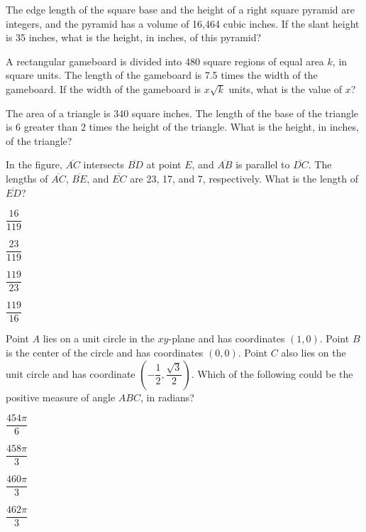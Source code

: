 \vfill
\noindent\begin{minipage}{\linewidth}
\par\smallskip
The edge length of the square base and the height of a right square pyramid are integers, and the pyramid has a volume of 16,464 cubic inches. If the slant height is 35 inches, what is the height, in inches, of this pyramid?
\end{minipage}
\vfill
\noindent\begin{minipage}{\linewidth}
\par\smallskip
A rectangular gameboard is divided into 480 square regions of equal area $k$, in square units. The length of the gameboard is 7.5 times the width of the gameboard. If the width of the gameboard is $x\sqrt{k}$ units, what is the value of $x$?
\end{minipage}
\vfill
\clearpage
\noindent\begin{minipage}{\linewidth}
\par\smallskip
The area of a triangle is 340 square inches. The length of the base of the triangle is 6 greater than 2 times the height of the triangle. What is the height, in inches, of the triangle?
\end{minipage}
\vfill
\noindent\begin{minipage}{\linewidth}
\par\smallskip
In the figure, $\overline{AC}$ intersects $\overline{BD}$ at point $E$, and $\overline{AB}$ is parallel to $\overline{DC}$. The lengths of $\overline{AC}$, $\overline{BE}$, and $\overline{EC}$ are 23, 17, and 7, respectively. What is the length of $\overline{ED}$?
\satfig{\figbowtieiii}
\satnotetoscale
\begin{satchoices}
  \item[A)] $\dfrac{16}{119}$
  \item[B)] $\dfrac{23}{119}$
  \item[C)] $\dfrac{119}{23}$
  \item[D)] $\dfrac{119}{16}$
\end{satchoices}
\end{minipage}
\vfill
\noindent\begin{minipage}{\linewidth}
\par\smallskip
Point $A$ lies on a unit circle in the $xy$-plane and has coordinates $(1,0)$. Point $B$ is the center of the circle and has coordinates $(0,0)$. Point $C$ also lies on the unit circle and has coordinate $\left(-\dfrac{1}{2},\dfrac{\sqrt{3}}{2}\right)$. Which of the following could be the positive measure of angle $ABC$, in radians?
\begin{satchoices}
  \item[A)] $\dfrac{454\pi}{6}$
  \item[B)] $\dfrac{458\pi}{3}$
  \item[C)] $\dfrac{460\pi}{3}$
  \item[D)] $\dfrac{462\pi}{3}$
\end{satchoices}
\end{minipage}
